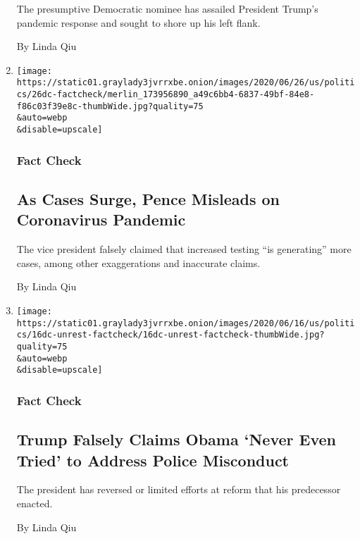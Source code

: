 \begin{enumerate}
  The presumptive Democratic nominee has assailed President Trump's
  pandemic response and sought to shore up his left flank.

  By Linda Qiu
\item
  \href{/2020/06/26/us/politics/coronavirus-pence-fact-check.html}{}

  \texttt{[image: https://static01.graylady3jvrrxbe.onion/images/2020/06/26/us/politics/26dc-factcheck/merlin\_173956890\_a49c6bb4-6837-49bf-84e8-f86c03f39e8c-thumbWide.jpg?quality=75\\\&auto=webp\\\&disable=upscale]}

  \hypertarget{fact-check-8}{%
  \subsubsection{Fact Check}\label{fact-check-8}}

  \hypertarget{as-cases-surge-pence-misleads-on-coronavirus-pandemic}{%
  \subsection{As Cases Surge, Pence Misleads on Coronavirus
  Pandemic}\label{as-cases-surge-pence-misleads-on-coronavirus-pandemic}}

  The vice president falsely claimed that increased testing ``is
  generating'' more cases, among other exaggerations and inaccurate
  claims.

  By Linda Qiu
\item
  \href{/2020/06/16/us/politics/trump-obama-police-misconduct-fact-check.html}{}

  \texttt{[image: https://static01.graylady3jvrrxbe.onion/images/2020/06/16/us/politics/16dc-unrest-factcheck/16dc-unrest-factcheck-thumbWide.jpg?quality=75\\\&auto=webp\\\&disable=upscale]}

  \hypertarget{fact-check-9}{%
  \subsubsection{Fact Check}\label{fact-check-9}}

  \hypertarget{trump-falsely-claims-obama-never-even-tried-to-address-police-misconduct}{%
  \subsection{Trump Falsely Claims Obama `Never Even Tried' to Address
  Police
  Misconduct}\label{trump-falsely-claims-obama-never-even-tried-to-address-police-misconduct}}

  The president has reversed or limited efforts at reform that his
  predecessor enacted.

  By Linda Qiu
\end{enumerate}

